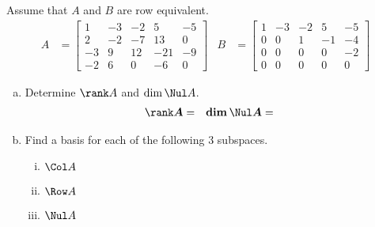 \begin{exercise} %
	Assume that $A$ and $B$ are row equivalent.
	\begin{align*}
	A &= \begin{bmatrix}1&-3&-2&5&-5\\2&-2&-7&13&0\\-3&9&12&-21&-9\\-2&6&0&-6&0\end{bmatrix} &
	B &= \begin{bmatrix}1&-3&-2&5&-5\\0&0&1&-1&-4\\0&0&0&0&-2\\0&0&0&0&0\end{bmatrix}
	\end{align*}
	\begin{enumerate}[(a)]
		\item Determine $\rank A$ and $\dim\Nul A$.
		\begin{align*}
		\boldsymbol{\rank A} &=		& \boldsymbol{\dim\Nul A} &=
		\end{align*}
		\item Find a basis for each of the following 3 subspaces.
			\begin{multicols}{2}
				\begin{enumerate}[(i)]
					\item $\Col A$ \vspace{1in}
					\item $\Row A$
					
					\columnbreak
					\item $\Nul A$ %
				\end{enumerate}
			\end{multicols}
	\end{enumerate}
	

\end{exercise}
